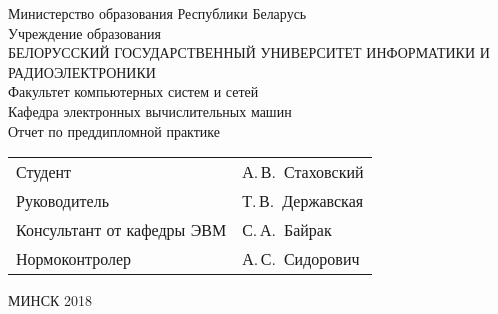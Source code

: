 \begin{titlepage}

    \begin{center}
        Министерство образования Республики Беларусь \\[1em]

        Учреждение образования \\

        \MakeUppercase{БЕЛОРУССКИЙ ГОСУДАРСТВЕННЫЙ УНИВЕРСИТЕТ ИНФОРМАТИКИ И РАДИОЭЛЕКТРОНИКИ} \\[1em]

        Факультет компьютерных систем и сетей \\[1em]

        Кафедра электронных вычислительных машин \\[5em] %

        {Отчет по преддипломной практике} \\[7em]

        \noindent

        \begin{tabular}{ p{}p{} }
            Студент & А.\,В.~Стаховский \\[1em]
            Руководитель & Т.\,В.~Державская \\[1em]
            Консультант от кафедры ЭВМ & С.\,А.~Байрак \\[1em]
            Нормоконтролер & А.\,С.~Сидорович \\
        \end{tabular}

        \vfill

        {\normalsize МИНСК 2018}
    \end{center}

\end{titlepage}
